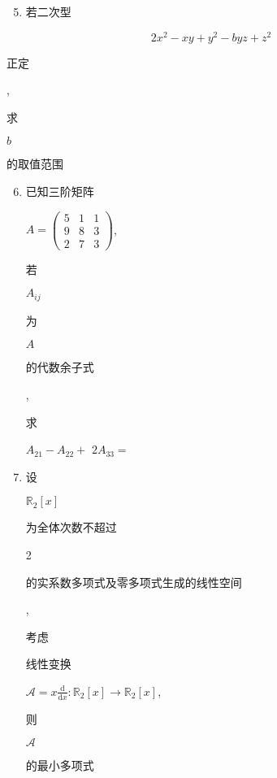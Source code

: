 \documentclass[10pt]{article}
\begin{document}
\begin{enumerate}
  \setcounter{enumi}{4}
  \item \begin{CJK}{UTF8}{mj}若二次型\end{CJK}
\end{enumerate}
$$
2 x^{2}-x y+y^{2}-b y z+z^{2}
$$
\begin{CJK}{UTF8}{mj}正定\end{CJK}, \begin{CJK}{UTF8}{mj}求\end{CJK} $b$ \begin{CJK}{UTF8}{mj}的取值范围\end{CJK}

\begin{enumerate}
  \setcounter{enumi}{5}
  \item \begin{CJK}{UTF8}{mj}已知三阶矩阵\end{CJK} $A=\left(\begin{array}{lll}5 & 1 & 1 \\ 9 & 8 & 3 \\ 2 & 7 & 3\end{array}\right)$, \begin{CJK}{UTF8}{mj}若\end{CJK} $A_{i j}$ \begin{CJK}{UTF8}{mj}为\end{CJK} $A$ \begin{CJK}{UTF8}{mj}的代数余子式\end{CJK}, \begin{CJK}{UTF8}{mj}求\end{CJK} $A_{21}-A_{22}+$ $2 A_{33}=$

  \item \begin{CJK}{UTF8}{mj}设\end{CJK} $\mathbb{R}_{2}[x]$ \begin{CJK}{UTF8}{mj}为全体次数不超过\end{CJK} 2 \begin{CJK}{UTF8}{mj}的实系数多项式及零多项式生成的线性空间\end{CJK}, \begin{CJK}{UTF8}{mj}考虑\end{CJK} \begin{CJK}{UTF8}{mj}线性变换\end{CJK} $\mathscr{A}=x \frac{\mathrm{d}}{\mathrm{d} x}: \mathbb{R}_{2}[x] \rightarrow \mathbb{R}_{2}[x]$, \begin{CJK}{UTF8}{mj}则\end{CJK} $\mathscr{A}$ \begin{CJK}{UTF8}{mj}的最小多项式\end{CJK}

\end{enumerate}
\end{document}
